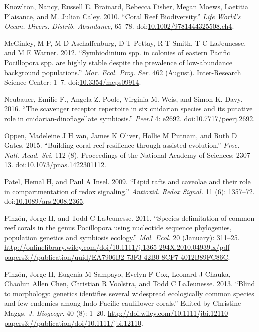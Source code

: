 \documentclass[]{elsarticle} %
\begin{document}
\hypertarget{ref-Knowlton2010}{}
Knowlton, Nancy, Russell E. Brainard, Rebecca Fisher, Megan Moews,
Laetitia Plaisance, and M. Julian Caley. 2010. ``Coral Reef
Biodiversity.'' \emph{Life World's Ocean. Divers. Distrib. Abundance},
65--78.
doi:\href{https://doi.org/10.1002/9781444325508.ch4}{10.1002/9781444325508.ch4}.

\hypertarget{ref-McGinley_2012}{}
McGinley, M P, M D Aschaffenburg, D T Pettay, R T Smith, T C LaJeunesse,
and M E Warner. 2012. ``Symbiodinium spp. in colonies of eastern Pacific
Pocillopora spp. are highly stable despite the prevalence of
low-abundance background populations.'' \emph{Mar. Ecol. Prog. Ser.} 462
(August). Inter-Research Science Center: 1--7.
doi:\href{https://doi.org/10.3354/meps09914}{10.3354/meps09914}.

\hypertarget{ref-Neubauer2016a}{}
Neubauer, Emilie F., Angela Z. Poole, Virginia M. Weis, and Simon K.
Davy. 2016. ``The scavenger receptor repertoire in six cnidarian species
and its putative role in cnidarian-dinoflagellate symbiosis.''
\emph{PeerJ} 4: e2692.
doi:\href{https://doi.org/10.7717/peerj.2692}{10.7717/peerj.2692}.

\hypertarget{ref-van_Oppen_2015}{}
Oppen, Madeleine J H van, James K Oliver, Hollie M Putnam, and Ruth D
Gates. 2015. ``Building coral reef resilience through assisted
evolution.'' \emph{Proc. Natl. Acad. Sci.} 112 (8). Proceedings of the
National Academy of Sciences: 2307--13.
doi:\href{https://doi.org/10.1073/pnas.1422301112}{10.1073/pnas.1422301112}.

\hypertarget{ref-Patel2009}{}
Patel, Hemal H, and Paul A Insel. 2009. ``Lipid rafts and caveolae and
their role in compartmentation of redox signaling.'' \emph{Antioxid.
Redox Signal.} 11 (6): 1357--72.
doi:\href{https://doi.org/10.1089/ars.2008.2365}{10.1089/ars.2008.2365}.

\hypertarget{ref-Pinzon2011}{}
Pinzón, Jorge H, and Todd C LaJeunesse. 2011. ``Species delimitation of
common reef corals in the genus Pocillopora using nucleotide sequence
phylogenies, population genetics and symbiosis ecology.'' \emph{Mol.
Ecol.} 20 (January): 311--25.
\href{http://onlinelibrary.wiley.com/doi/10.1111/j.1365-294X.2010.04939.x/pdf\%20papers3://publication/uuid/EA7906B2-73F3-42B0-8CF7-4012B89FC86C}{http://onlinelibrary.wiley.com/doi/10.1111/j.1365-294X.2010.04939.x/pdf papers3://publication/uuid/EA7906B2-73F3-42B0-8CF7-4012B89FC86C}.

\hypertarget{ref-Pinzon2013}{}
Pinzón, Jorge H, Eugenia M Sampayo, Evelyn F Cox, Leonard J Chauka,
Chaolun Allen Chen, Christian R Voolstra, and Todd C LaJeunesse. 2013.
``Blind to morphology: genetics identifies several widespread
ecologically common species and few endemics among Indo-Pacific
cauliflower corals.'' Edited by Christine Maggs. \emph{J. Biogeogr.} 40
(8): 1--20.
\href{http://doi.wiley.com/10.1111/jbi.12110\%20papers3://publication/doi/10.1111/jbi.12110}{http://doi.wiley.com/10.1111/jbi.12110 papers3://publication/doi/10.1111/jbi.12110}.
\end{document}
